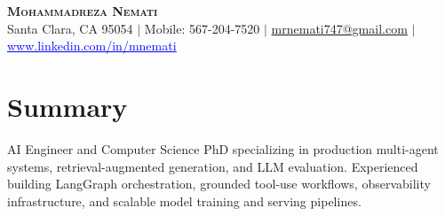 \documentclass[letterpaper,13pt]{article}
\begin{document}
\begin{center}
    \textbf{\LARGE \scshape Mohammadreza Nemati} \\ \vspace{1pt}
    \small Santa Clara, CA 95054 $|$ Mobile: 567-204-7520 $|$
    \href{mailto:mrnemati747@gmail.com}{mrnemati747@gmail.com} $|$
    \href{https://www.linkedin.com/in/mnemati/}{\textcolor{blue}{\underline{www.linkedin.com/in/mnemati}}}
\end{center}

\section{Summary}
\small{AI Engineer and Computer Science PhD specializing in production multi-agent systems, retrieval-augmented generation, and LLM evaluation. Experienced building LangGraph orchestration, grounded tool-use workflows, observability infrastructure, and scalable model training and serving pipelines.}
\vspace{0.05cm}
\end{document}
